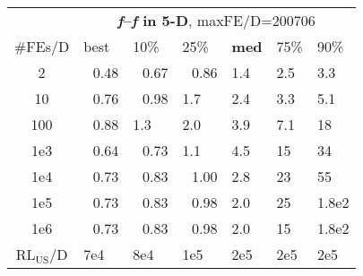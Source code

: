 \begin{tabular}{c|llllll}
 & \multicolumn{6}{|c}{\textbf{\textit{f}\raisebox{-0.35ex}{1}--\textit{f}\raisebox{-0.35ex}{24} in 5-D}, maxFE/D=200706}\\
\#FEs/D & best & 10\% & 25\% & \textbf{med} & 75\% & 90\%\\
2 & ~\,0.48 & ~\,0.67 & ~\,0.86 & \hspace*{1ex}1.4 & \hspace*{1ex}2.5 & \hspace*{1ex}3.3\\
10 & ~\,0.76 & ~\,0.98 & \hspace*{1ex}1.7 & \hspace*{1ex}2.4 & \hspace*{1ex}3.3 & \hspace*{1ex}5.1\\
100 & ~\,0.88 & \hspace*{1ex}1.3 & \hspace*{1ex}2.0 & \hspace*{1ex}3.9 & \hspace*{1ex}7.1 & 18\\
1e3 & ~\,0.64 & ~\,0.73 & \hspace*{1ex}1.1 & \hspace*{1ex}4.5 & 15 & 34\\
1e4 & ~\,0.73 & ~\,0.83 & ~\,1.00 & \hspace*{1ex}2.8 & 23 & 55\\
1e5 & ~\,0.73 & ~\,0.83 & ~\,0.98 & \hspace*{1ex}2.0 & 25 & 1.8e2\\
1e6 & ~\,0.73 & ~\,0.83 & ~\,0.98 & \hspace*{1ex}2.0 & 15 & 1.8e2\\
$\text{RL}_{\text{US}}$/D & 7e4 & 8e4 & 1e5 & 2e5 & 2e5 & 2e5
\end{tabular}
